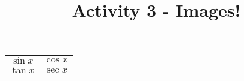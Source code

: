 \documentclass{ximera}
\title{Activity 3 - Images!}
\begin{document}
\maketitle

\begin{tabular}{c|c}
    $\sin x$ & $\cos x$ \\
    $\tan x$ & $\sec x$ 
\end{tabular}
\end{document}
